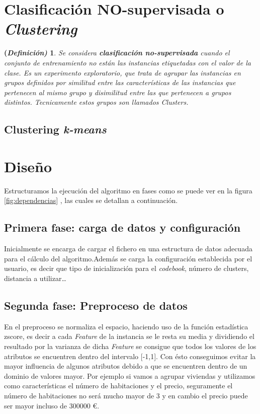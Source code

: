 \documentclass[10pt,a4paper]{article}
\newtheorem{defi}{(\it Definición)}[section]%
\begin{document}
\section{Clasificación \textbf{NO-supervisada} o \textit{Clustering}}

\begin{defi}
	Se considera \textbf{clasificación no-supervisada} cuando el conjunto de
	entrenamiento  no están las instancias etiquetadas con el valor de la clase. Es
	un experimento exploratorio, que trata de agrupar las instancias en grupos
	definidos por similitud entre las características de las instancias que
	pertenecen al mismo grupo y disimilitud entre las que pertenecen a grupos
	distintos. Tecnicamente estos grupos son llamados \textit{Clusters}.
\end{defi}

\subsection{Clustering \textit{\textbf{k-means}}}


\section{Diseño}
 
 Estructuramos la ejecución del algoritmo en fases como se puede ver en la figura \ref{fig:dependencias} , las cuales se detallan a continuación.\\
 
\subsection*{Primera fase: carga de datos y configuración}
 
 Inicialmente se encarga de cargar el fichero en una estructura de datos adecuada para el cálculo del algoritmo.Además se carga la configuración establecida
 por el usuario, es decir que tipo de inicialización para el \textit{codebook}, número de clusters, distancia a utilizar\dots

\subsection*{Segunda fase: Preproceso de datos}

En el preproceso se normaliza el espacio, haciendo uso de la función estadística zscore, es decir a cada \textit{Feature} de la instancia se le resta su media y dividiendo el resultado por la varianza de dicha \textit{Feature} se consigue que todos los valores de los atributos se encuentren dentro del intervalo [-1,1]. Con ésto conseguimos evitar la mayor influencia de algunos atributos debido a que se encuentren dentro de un dominio de valores mayor. Por ejemplo si vamos a agrupar viviendas y utilizamos como características el número de habitaciones y el precio, seguramente el número de habitaciones no será mucho mayor de 3 y en cambio el precio puede ser mayor incluso de 300000 \euro .\cite{coursera}
\end{document}
